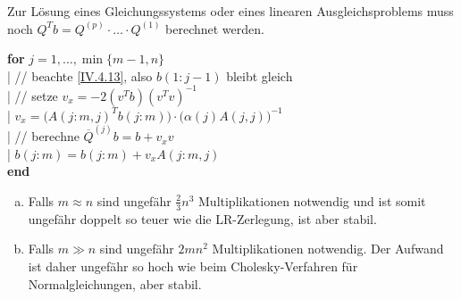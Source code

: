 Zur Lösung eines Gleichungssystems oder eines linearen Ausgleichsproblems
muss noch $Q^Tb=Q^{(p)}\cdot \dots \cdot Q^{(1)}$ berechnet werden.

\begin{pseudocode}{0.7\linewidth}
  \textbf{for} $j=1,\dots, \min\{m-1,n\}$\\
  |	\> // beachte \eqref{IV.4.13}, also $b(1:j-1)$ bleibt gleich\\
  |	\> // setze $v_x=-2(v^Tb)(v^Tv)^{-1}$\\
  |	\> $v_x=\big(A(j:m,j)^Tb(j:m)\big)\cdot \big(\alpha(j)A(j,j)\big)^{-1}$ \\
  |	\> // berechne $\overline{Q}^{(j)} b=b+v_xv$\\
  |	\> $b(j:m) = b(j:m)+v_xA(j:m,j)$\\
  \textbf{end}
\end{pseudocode}


\begin{enumerate}[a)]
\item Falls $m\approx n$ sind ungefähr $\frac{2}{3}n^3$ Multiplikationen notwendig
  und ist somit ungefähr doppelt so teuer wie die LR-Zerlegung, ist aber stabil.
\item Falls $m\gg n$ sind ungefähr $2mn^2$ Multiplikationen notwendig.
  Der Aufwand ist daher ungefähr so hoch wie beim Cholesky-Verfahren für Normalgleichungen,
  aber stabil.
\end{enumerate}
